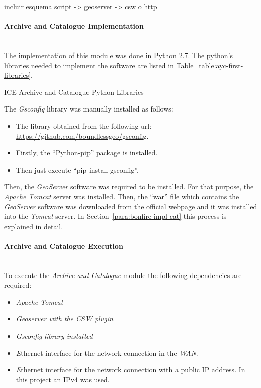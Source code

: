 incluir esquema script -> geoserver -> csw o http

\paragraph{Archive and Catalogue Implementation}~\\

The implementation of this module was done in Python 2.7. The python's libraries
needed to implement the software are listed in
Table~\ref{table:ayc-first-libraries}.

\begin{table}[hp]
  \centering
  {\small
  
  }
  \caption{ICE Archive and Catalogue Python Libraries}
  \label{table:ayc-first-libraries}
\end{table}

The \emph{Gsconfig} library was manually installed as follows:
\begin{itemize}
\item The library obtained from the following url: \url{https://github.com/boundlessgeo/gsconfig}.
\item Firstly, the ``Python-pip''  package is installed.
\item Then just execute ``pip install gsconfig''.
\end{itemize}

Then, the \emph{GeoServer} software was required to be installed. For that purpose, the
\emph{Apache Tomcat} server was installed. Then, the ``war''
file which contains the \emph{GeoServer} software was downloaded from the official webpage and
it was installed into the \emph{Tomcat} server. In Section~\ref{para:bonfire-impl-cat} this process
is explained in detail. 

\paragraph{Archive and Catalogue Execution}~\\

To execute the \emph{Archive and Catalogue} module the following dependencies
are required:
\begin{itemize}
\item \emph{Apache Tomcat}
\item \emph{Geoserver with the \ac{CSW} plugin}
\item \emph{Gsconfig library installed}
\item \emph Ethernet interface for the network connection in the \bonfire
  \emph{WAN}.
\item \emph Ethernet interface for the network connection with a public \ac{IP}
  address. In this project an \ac{IP}v4 was used.
\end{itemize}

